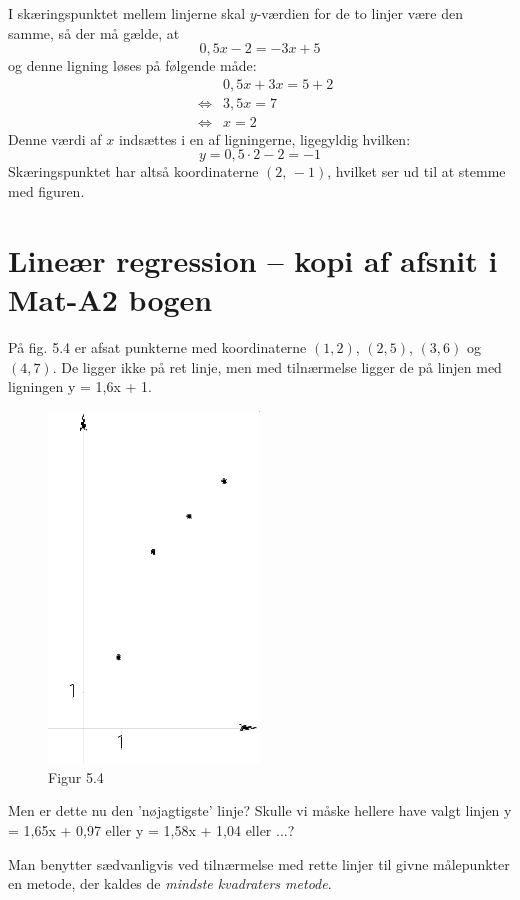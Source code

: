 \documentclass[12pt,oneside,a4paper]{article}
\newcommand{\bas}{\begin{eqnarray*}}
\newcommand{\eas}{\end{eqnarray*}}
\begin{document}
I skæringspunktet mellem linjerne skal $y$-værdien for de to linjer være den
samme, så der må gælde, at
$$
0,5x-2 = -3x+5
$$
og denne ligning løses på følgende måde:
\bas
&& 0,5x+3x=5+2\\
&\iff& 3,5x=7\\
&\iff& x=2
\eas
Denne værdi af $x$ indsættes i en af ligningerne, ligegyldig hvilken:
$$
y=0,5\cdot2-2=-1
$$
Skæringspunktet har altså koordinaterne $(2,\,-1)$, hvilket ser ud til at
stemme med figuren.

\section{Lineær regression -- kopi af afsnit i Mat-A2 bogen}
På fig. 5.4 er afsat punkterne med koordinaterne $(1, 2)$, $(2, 5)$, $(3, 6)$ og $(4,
7)$. De ligger ikke på ret linje, men med tilnærmelse ligger de på linjen med
ligningen y = 1,6x + 1.

\begin{figure}[ht]
    \centering
    \includegraphics[width=0.5\textwidth]{fig54}
    \caption{Figur 5.4}
    \label{fig54}
\end{figure}

Men er dette nu den 'nøjagtigste' linje? Skulle vi måske hellere have valgt
linjen y = 1,65x + 0,97 eller y = 1,58x + 1,04 eller ...?

Man benytter sædvanligvis ved tilnærmelse med rette linjer til givne
målepunkter en metode, der kaldes de {\em mindste kvadraters metode}.
\end{document}
